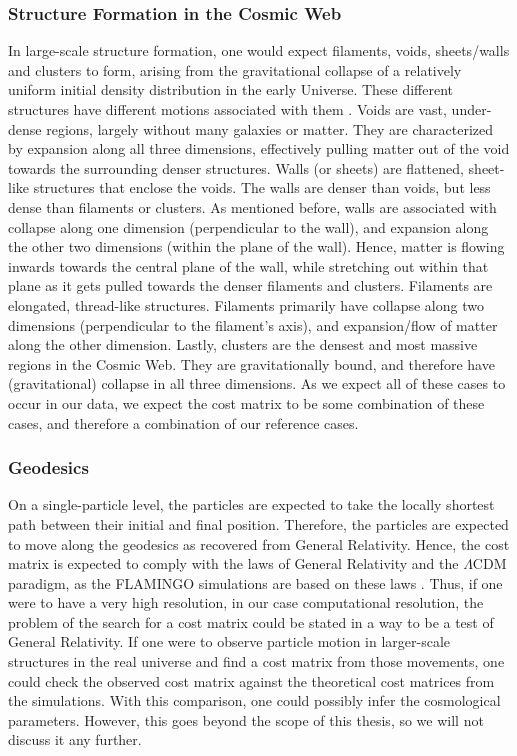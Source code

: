 \subsubsection{Structure Formation in the Cosmic Web}
In large-scale structure formation, one would expect filaments, voids, sheets/walls and clusters to form, arising from the gravitational collapse of a relatively uniform initial density distribution in the early Universe. These different structures have different motions associated with them \citep{bos2016}. Voids are vast, under-dense regions, largely without many galaxies or matter. They are characterized by expansion along all three dimensions, effectively pulling matter out of the void towards the surrounding denser structures. Walls (or sheets) are flattened, sheet-like structures that enclose the voids. The walls are denser than voids, but less dense than filaments or clusters. As mentioned before, walls are associated with collapse along one dimension (perpendicular to the wall), and expansion along the other two dimensions (within the plane of the wall). Hence, matter is flowing inwards towards the central plane of the wall, while stretching out within that plane as it gets pulled towards the denser filaments and clusters. Filaments are elongated, thread-like structures. Filaments primarily have collapse along two dimensions (perpendicular to the filament's axis), and expansion/flow of matter along the other dimension. Lastly, clusters are the densest and most massive regions in the Cosmic Web. They are gravitationally bound, and therefore have (gravitational) collapse in all three dimensions. As we expect all of these cases to occur in our data, we expect the cost matrix to be some combination of these cases, and therefore a combination of our reference cases.

\subsubsection{Geodesics}
On a single-particle level, the particles are expected to take the locally shortest path between their initial and final position. Therefore, the particles are expected to move along the geodesics as recovered from General Relativity. Hence, the cost matrix is expected to comply with the laws of General Relativity and the $\Lambda$CDM paradigm, as the FLAMINGO simulations are based on these laws \citep{schaye2023}. Thus, if one were to have a very high resolution, in our case computational resolution, the problem of the search for a cost matrix could be stated in a way to be a test of General Relativity. If one were to observe particle motion in larger-scale structures in the real universe and find a cost matrix from those movements, one could check the observed cost matrix against the theoretical cost matrices from the simulations. With this comparison, one could possibly infer the cosmological parameters. However, this goes beyond the scope of this thesis, so we will not discuss it any further. 

